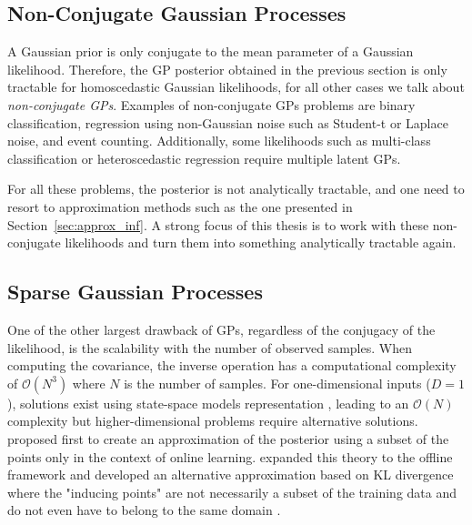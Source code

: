 \subsection{Non-Conjugate Gaussian Processes}

A Gaussian prior is only conjugate to the mean parameter of a Gaussian likelihood.
Therefore, the \ac{GP} posterior obtained in the previous section is only tractable for homoscedastic Gaussian likelihoods, for all other cases we talk about \textit{non-conjugate \ac{GPs}}.
Examples of non-conjugate \ac{GPs} problems are binary classification, regression using non-Gaussian noise such as Student-t or Laplace noise, and event counting.
Additionally, some likelihoods such as multi-class classification or heteroscedastic regression require multiple latent \ac{GPs}.

For all these problems, the posterior is not analytically tractable, and one need to resort to approximation methods such as the one presented in Section~\ref{sec:approx_inf}.
A strong focus of this thesis is to work with these non-conjugate likelihoods and turn them into something analytically tractable again.

\subsection{Sparse Gaussian Processes}
One of the other largest drawback of \ac{GPs}, regardless of the conjugacy of the likelihood, is the scalability with the number of observed samples.
When computing the covariance, the inverse operation has a computational complexity of $\mathcal{O}(N^3)$ where $N$ is the number of samples.
For one-dimensional inputs ($D=1$), solutions exist using state-space models representation \cite{pmlr-v9-turner10a,solinInfiniteHorizonGaussianProcesses2018}, leading to an $\mathcal{O}(N)$ complexity but higher-dimensional problems require alternative solutions.
\citet{csato2002sparse} proposed first to create an approximation of the posterior using a subset of the points only in the context of online learning.
\citet{snelsonSparseGaussianProcesses2009} expanded this theory to the offline framework and \citet{Titsias2009} developed an alternative approximation based on KL divergence where the "inducing points" are not necessarily a subset of the training data and do not even have to belong to the same domain \cite{NIPS2009_5ea1649a, vdw2020framework}.

